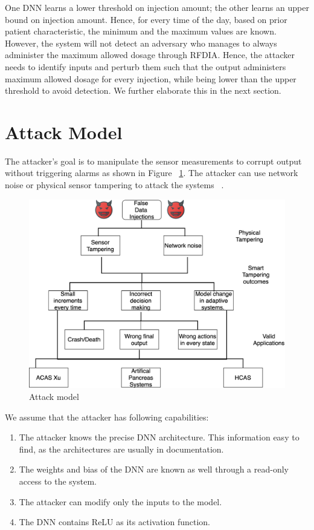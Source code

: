 One \ac{DNN} learns a lower threshold on injection amount; the other learns an upper bound on injection amount. 
Hence, for every time of the day, based on prior patient characteristic, the minimum and the maximum values are known. 
However, the system will not detect  an adversary  who manages to always administer the maximum allowed dosage through \ac{RFDIA}. 
Hence, the attacker needs to identify inputs and  perturb them  such that the output administers maximum allowed dosage for every injection,
  while being lower than the upper threshold to avoid detection. 
  We further elaborate this in the next section. 


\section{Attack Model}
The attacker's goal is to manipulate the sensor measurements to corrupt output without triggering alarms as shown in Figure ~\ref{fig:attackmodelphysical}. 
The attacker can use network noise or physical sensor tampering to attack the systems ~\cite{10.1145/3319535.3339815}.
 
\begin{figure}
	\centering
	\includegraphics[width=0.7\linewidth]{Images/Attackmodelphysical}
	\caption{Attack model}
	\label{fig:attackmodelphysical}
\end{figure}

We assume that the attacker has following capabilities:
\begin{enumerate}
	\item The attacker knows the precise \ac{DNN}  architecture. This information easy to find, as the architectures are  usually in documentation. 
	\item  The weights and bias of the \ac{DNN}  are known as well through a read-only access to the system.  
	\item The attacker can modify only the inputs to the model.
	\item The \ac{DNN} contains ReLU as its activation function. %
\end{enumerate}

